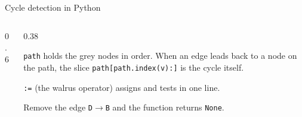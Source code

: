 \documentclass[aspectratio=169,10pt]{beamer}
\newcommand{\pycodes}[2]{}
\begin{document}
\begin{frame}{Cycle detection in Python}
\begin{columns}[T]
\begin{column}{0.6\textwidth}
\pycodes{\fontsize{8}{9.6}}{cycle}
\end{column}
\begin{column}{0.38\textwidth}
\vspace{2mm}
{\small
\texttt{path} holds the grey nodes in order. When an edge leads back to a node on the path, the slice \texttt{path[path.index(v):]} is the cycle itself.

\vspace{2mm}
\texttt{:=} (the walrus operator) assigns and tests in one line.

\vspace{2mm}
Remove the edge \texttt{D}$\to$\texttt{B} and the function returns \texttt{None}.}
\end{column}
\end{columns}
\end{frame}
\end{document}
